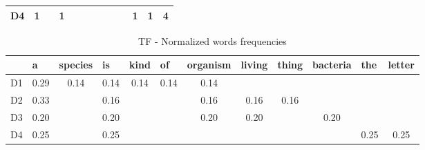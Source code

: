 \begin{itemize}
\begin{table}[H]
\begin{tabular}{@{}lccccccccccc|c|@{}}
		D4 & 1                     &                             & 1                      &                          &                        &                              &                            &                           &                              & 1                       & 1                           & 4                          \\ \bottomrule
	\end{tabular}
\end{table}
\begin{table}[H]
	\centering
	\caption{TF - Normalized words frequencies}
	\label{tf_idf_tf_norm_freq}
	\begin{tabular}{@{}lccccccccccc@{}}
		\toprule
		& \multicolumn{1}{l}{a} & \multicolumn{1}{l}{species} & \multicolumn{1}{l}{is} & \multicolumn{1}{l}{kind} & \multicolumn{1}{l}{of} & \multicolumn{1}{l}{organism} & \multicolumn{1}{l}{living} & \multicolumn{1}{l}{thing} & \multicolumn{1}{l}{bacteria} & \multicolumn{1}{l}{the} & \multicolumn{1}{l}{letter} \\ \midrule
		D1 & 0.29                  & 0.14                        & 0.14                   & 0.14                     & 0.14                   & 0.14                         &                            &                           &                              &                         &                            \\
		D2 & 0.33                  &                             & 0.16                   &                          &                        & 0.16                         & 0.16                       & 0.16                      &                              &                         &                            \\
		D3 & 0.20                  &                             & 0.20                   &                          &                        & 0.20                         & 0.20                       &                           & 0.20                         &                         &                            \\
		D4 & 0.25                  &                             & 0.25                   &                          &                        &                              &                            &                           &                              & 0.25                    & 0.25                       \\ \bottomrule
	\end{tabular}
\end{table}
	

\end{itemize}
